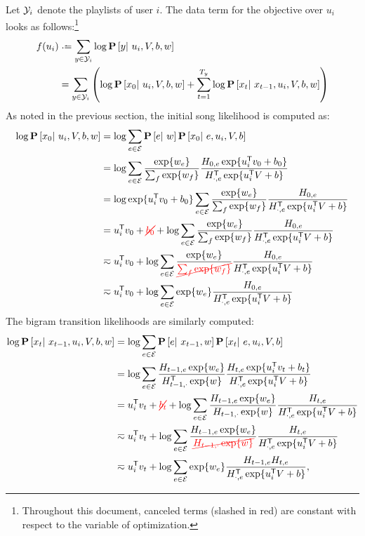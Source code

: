 \documentclass{article}
\newcommand{\ccancel}[2][black]{\color{#1}\cancel{#2}\normalcolor}
\def\E{\ensuremath{\mathcal{E}}}
\begin{document}
Let $\mathcal{Y}_i$ denote the playlists of user $i$. The data term for the objective over $u_i$ looks as follows:\footnote{Throughout this document, canceled terms (slashed in red) are 
constant with respect to the variable of optimization.  }
\begin{align}
f(u_i) &\defeq \sum_{y \in \Y_i} \log\P\left[y\given u_i, V, b, w\right]\notag\\
&= \sum_{y \in \Y_i}\left( \log \P\left[x_0 \given u_i, V, b, w \right] +
\sum_{t=1}^{T_y} \log \P\left[x_t \given x_{t-1}, u_i, V, b, w \right] \right)\label{eq:ustep:obj}
\end{align}
As noted in the previous section, the initial song likelihood is computed as:
\begin{align}
\log\P\left[x_0 \given u_i, V, b, w\right] &= \log\sum_{e\in \E} \P\left[e\given w\right]\P\left[x_0 \given e, u_i, V, b \right] \notag\\
&= \log\sum_{e\in \E} \frac{\exp\{ w_e\}}{\sum_f \exp\{w_f\}} \frac{H_{0, e} \exp\{u_i\trans v_0 + b_0 \} }{H_{\cdot, e}\trans \exp\{u_i\trans V + b \} }\notag\\
&= \log \exp\{u_i\trans v_0 + b_0 \} \sum_{e \in \E} \frac{\exp\{ w_e \}}{\sum_f \exp\{w_f\}}\frac{ H_{0, e} }{H_{\cdot, e}\trans \exp\{u_i\trans V + b \} }\notag\\
&= u_i\trans v_0 + \ccancel[red]{b_0} + \log \sum_{e\in \E}\frac{\exp\{w_e\}}{\sum_f \exp\{w_f\}}\frac{ H_{0, e}}{H_{\cdot, e}\trans \exp\{u_i\trans V + b \}}\notag\\
&\eqsim u_i\trans v_0 + \log \sum_{e\in \E}\frac{\exp\{w_e\}}{\ccancel[red]{\sum_f \exp\{w_f\}}}\frac{ H_{0, e}}{H_{\cdot, e}\trans \exp\{u_i\trans V + b \}}\notag\\%
&\eqsim u_i\trans v_0 + \log \sum_{e\in \E}\exp\{w_e\}\frac{ H_{0, e}}{H_{\cdot, e}\trans \exp\{u_i\trans V + b \}}\label{eq:ustep:initial}
\end{align}
The bigram transition likelihoods are similarly computed:
\begin{align}
\log\P\left[x_t \given x_{t-1}, u_i, V, b, w\right] &= \log\sum_{e\in \E} \P\left[e \given x_{t-1}, w \right]\P\left[x_t \given e, u_i, V, b \right]\notag\\
&= \log\sum_{e\in \E} \frac{H_{t-1,e} \exp\{w_e\} }{H_{t-1,\cdot}\trans \exp\{w\}} \frac{H_{t,e} \exp\{u_i\trans v_t + b_t \} }{H_{\cdot,e}\trans \exp\{u_i\trans V + b \} }\notag\\
&= u_i\trans v_t + \ccancel[red]{b_t} + \log\sum_{e\in \E} \frac{H_{t-1,e}\exp\{w_e\} }{H_{t-1,\cdot}\exp\{w\}}\frac{H_{t, e}}{H_{\cdot,e}\trans \exp\{u_i\trans V + b \} }\notag\\
&\eqsim u_i\trans v_t + \log\sum_{e\in \E} \frac{H_{t-1,e} \exp\{w_e\}}{\ccancel[red]{H_{t-1,\cdot} \exp\{w\} }}\frac{ H_{t,e} }{H_{\cdot,e}\trans \exp\{u_i\trans V + b \} }\notag\\
&\eqsim u_i\trans v_t + \log\sum_{e\in \E} \exp\{w_e\} \frac{H_{t-1,e} H_{t,e} }{H_{\cdot,e}\trans \exp\{u_i\trans V + b \} },\label{eq:ustep:bigram}
\end{align}
\end{document}
